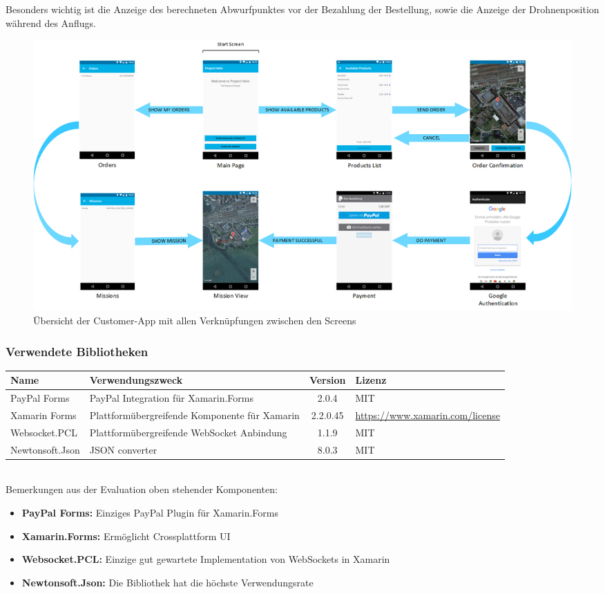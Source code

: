 Besonders wichtig ist die Anzeige des berechneten Abwurfpunktes vor der Bezahlung der Bestellung, sowie die Anzeige der Drohnenposition während des Anflugs.  

\begin{landscape}
	\begin{figure}[h]
		\centering
		\includegraphics[width=0.8\paperheight] {images/customer-app-pages.png}
		\caption{Übersicht der Customer-App mit allen Verknüpfungen zwischen den Screens}
		\label{fig:customer-app-flow}
	\end{figure}
\end{landscape}

\subsubsection{Verwendete Bibliotheken}
\begin{tabularx}{\textwidth}{|X|X|c|X|}
	\hline
	\textbf{Name} & \textbf{Verwendungszweck} & \textbf{Version} & \textbf{Lizenz} \\
	\hline \hline
	PayPal Forms & PayPal Integration für Xamarin.Forms & 2.0.4 & MIT \\
	\hline 
	Xamarin Forms & Plattformübergreifende Komponente für Xamarin & 2.2.0.45 & \url{https://www.xamarin.com/license} \\
	\hline 
	Websocket.PCL & Plattformübergreifende WebSocket Anbindung & 1.1.9 & MIT \\
	\hline 
	Newtonsoft.Json & JSON converter & 8.0.3 & MIT \\
	\hline 
\end{tabularx}\\

Bemerkungen aus der Evaluation oben stehender Komponenten:
\begin{itemize}
	\item{\textbf{PayPal Forms:} Einziges PayPal Plugin für Xamarin.Forms}
	\item{\textbf{Xamarin.Forms:} Ermöglicht Crossplattform UI}
	\item{\textbf{Websocket.PCL:} Einzige gut gewartete Implementation von WebSockets in Xamarin}
	\item{\textbf{Newtonsoft.Json:} Die Bibliothek hat die höchste Verwendungsrate}
\end{itemize}

